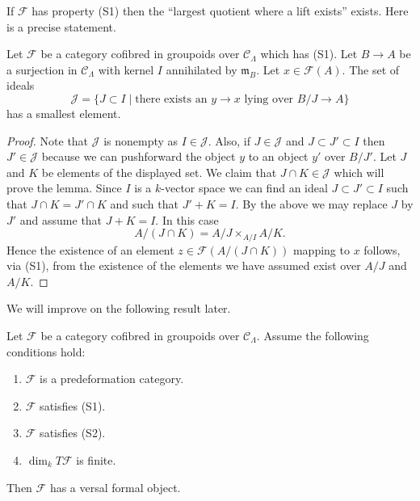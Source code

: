 \noindent
If $\mathcal{F}$ has property (S1) then the ``largest quotient where
a lift exists'' exists. Here is a precise statement.

\begin{lemma}
\label{lemma-largest-closed-where-lift}
Let $\mathcal{F}$ be a category cofibred in groupoids over
$\mathcal{C}_\Lambda$ which has (S1). Let $B \to A$ be a surjection
in $\mathcal{C}_\Lambda$ with kernel $I$ annihilated by $\mathfrak m_B$.
Let $x \in \mathcal{F}(A)$. The set of ideals
$$
\mathcal{J} = \{ J \subset I \mid
\text{there exists an }y \to x\text{ lying over }B/J \to A\}
$$
has a smallest element.
\end{lemma}

\begin{proof}
Note that $\mathcal{J}$ is nonempty as $I \in \mathcal{J}$.
Also, if $J \in \mathcal{J}$ and $J \subset J' \subset I$ then
$J' \in \mathcal{J}$ because we can pushforward the object $y$ to an
object $y'$ over $B/J'$. Let $J$ and $K$ be elements of the displayed set.
We claim that $J \cap K \in \mathcal{J}$ which will prove the lemma.
Since $I$ is a $k$-vector space we can find an ideal $J \subset J' \subset I$
such that $J \cap K = J' \cap K$ and such that $J' + K = I$. By the above
we may replace $J$ by $J'$ and assume that $J + K = I$. In this case
$$
A/(J \cap K) = A/J \times_{A/I} A/K.
$$
Hence the existence of an element $z \in \mathcal{F}(A/(J \cap K))$
mapping to $x$ follows, via (S1), from the existence of the elements we have
assumed exist over $A/J$ and $A/K$.
\end{proof}

\noindent
We will improve on the following result later.

\begin{lemma}
\label{lemma-versal-object-existence}
Let $\mathcal{F}$ be a category cofibred in groupoids over
$\mathcal{C}_\Lambda$. Assume the following conditions hold:
\begin{enumerate}
\item $\mathcal{F}$ is a predeformation category.
\item $\mathcal{F}$ satisfies (S1).
\item $\mathcal{F}$ satisfies (S2).
\item $\dim_{k} T\mathcal{F}$ is finite.
\end{enumerate}
Then $\mathcal{F}$ has a versal formal object.
\end{lemma}

